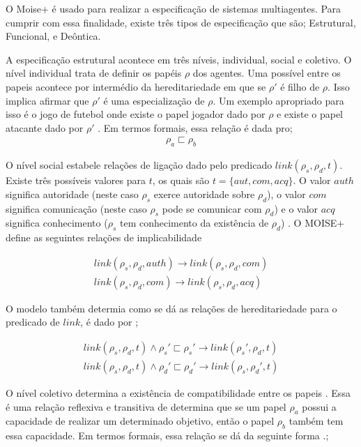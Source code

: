 \documentclass[12pt]{article}
\begin{document}
O Moise+ é usado para realizar a especificação de sistemas multiagentes. Para cumprir com essa finalidade, existe três tipos de especificação que são; Estrutural, Funcional, e Deôntica. 

A especificação estrutural acontece em três níveis, individual, social e coletivo. O nível individual trata de definir os papéis $\rho$ dos agentes. Uma possível entre os papeis acontece por intermédio da hereditariedade em que se $\rho'$ é filho de $\rho$. Isso implica afirmar que $\rho'$ é uma especialização de $\rho$. Um exemplo apropriado para isso é o jogo de futebol onde existe o papel jogador dado por $\rho$ e existe o papel atacante dado por $\rho'$ \cite{mosieframework}. Em termos formais, essa relação é dada pro; 
\begin{eqnarray}\nonumber
\rho_a \sqsubset \rho_b
\end{eqnarray}

O nível social estabele relações de ligação dado pelo predicado $link(\rho_s,\rho_d,t)$. Existe três possíveis valores para $t$, os quais são $t = \{aut, com, acq\}$. O valor $auth$ significa autoridade (neste caso $\rho_s$ exerce autoridade sobre $\rho_d$), o valor $com$ significa comunicação (neste caso $\rho_s$ pode se comunicar com $\rho_d$) e o valor $acq$ significa conhecimento ($\rho_s$ tem conhecimento da existência de $\rho_d$) \cite{mosieframework}. O MOISE+ define as seguintes relações de implicabilidade

\begin{eqnarray}\nonumber
	link(\rho_s,\rho_d,auth) \to link(\rho_s,\rho_d,com) \nonumber \\
	link(\rho_s,\rho_d,com) \to link(\rho_s,\rho_d,acq) 
\end{eqnarray}

O modelo também determia como se dá as relações de hereditariedade para o predicado de $link$, é dado por \cite{mosieframework}; 

\begin{eqnarray}\nonumber
	link(\rho_s,\rho_d,t) \wedge \rho_s' \sqsubset \rho_s' \to link(\rho_s',\rho_d,t) \nonumber \\
	link(\rho_s,\rho_d,t) \wedge \rho_d' \sqsubset \rho_d' \to link(\rho_s,\rho_d',t) 	
\end{eqnarray}


O nível coletivo determina a existência de compatibilidade entre os papeis \cite{mosieframework}. Essa é uma relação reflexiva e transitiva de determina que se um papel $\rho_a$ possui a capacidade de realizar um determinado objetivo, então o papel $\rho_b$ também tem essa capacidade. Em termos formais, essa relação se dá da seguinte forma \cite{mosieframework}.;
\end{document}
